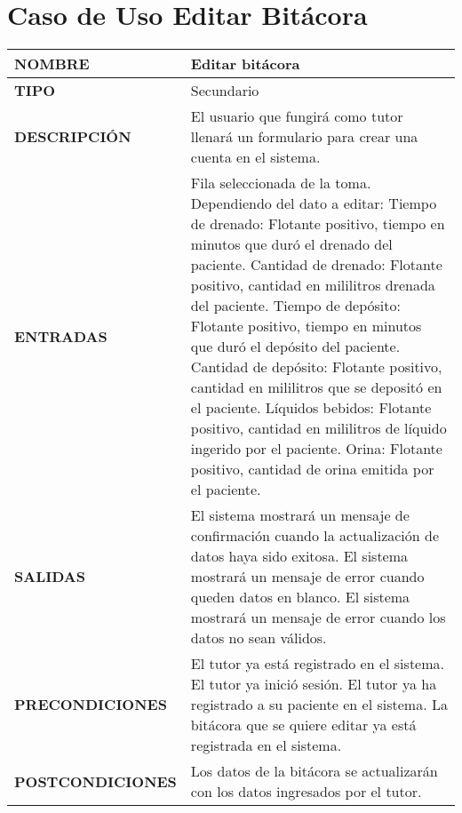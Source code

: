 \section{Caso de Uso Editar Bitácora}
\begin{longtable}{ | p{6cm} | p{10cm} |}
\hline
      \textbf{NOMBRE} & Editar bitácora\\
      \hline
      \textbf{TIPO} & Secundario\\
      \hline
      \textbf{DESCRIPCIÓN} & El usuario que fungirá como tutor llenará un formulario para crear una cuenta en el sistema.\\
      \hline
      \textbf{ENTRADAS} & Fila seleccionada de la toma.
\newline Dependiendo del dato a editar:
\newline Tiempo de drenado: Flotante positivo, tiempo en minutos que duró el drenado del paciente.
\newline Cantidad de drenado: Flotante positivo, cantidad en mililitros drenada del paciente.
\newline Tiempo de depósito: Flotante positivo, tiempo en minutos que duró el depósito del paciente.
\newline Cantidad de depósito: Flotante positivo, cantidad en mililitros que se depositó en el paciente.
\newline Líquidos bebidos: Flotante positivo, cantidad en mililitros de líquido ingerido por el paciente.
\newline Orina: Flotante positivo, cantidad de orina emitida por el paciente.\\
      \hline
      \textbf{SALIDAS} & El sistema mostrará un mensaje de confirmación cuando la actualización de datos haya sido exitosa.
\newline El sistema mostrará un mensaje de error cuando queden datos en blanco.
\newline El sistema mostrará un mensaje de error cuando los datos no sean válidos.\\
      \hline
      \textbf{PRECONDICIONES} & El tutor ya está registrado en el sistema.
\newline El tutor ya inició sesión.
\newline El tutor ya ha registrado a su paciente en el sistema.
\newline La bitácora que se quiere editar ya está registrada en el sistema.\\
      \hline
      \textbf{POSTCONDICIONES} & Los datos de la bitácora se actualizarán con los datos ingresados por el tutor.\\

\end{longtable}
